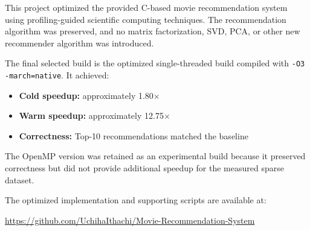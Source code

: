 \documentclass[11pt]{article}
\begin{document}
This project optimized the provided C-based movie recommendation system using profiling-guided scientific computing techniques. The recommendation algorithm was preserved, and no matrix factorization, SVD, PCA, or other new recommender algorithm was introduced.

The final selected build is the optimized single-threaded build compiled with \texttt{-O3 -march=native}. It achieved:

\begin{itemize}
    \item \textbf{Cold speedup:} approximately 1.80$\times$
    \item \textbf{Warm speedup:} approximately 12.75$\times$
    \item \textbf{Correctness:} Top-10 recommendations matched the baseline
\end{itemize}

The OpenMP version was retained as an experimental build because it preserved correctness but did not provide additional speedup for the measured sparse dataset.

\noindent The optimized implementation and supporting scripts are available at:

\begin{center}
\url{https://github.com/UchihaIthachi/Movie-Recommendation-System}
\end{center}
\end{document}
